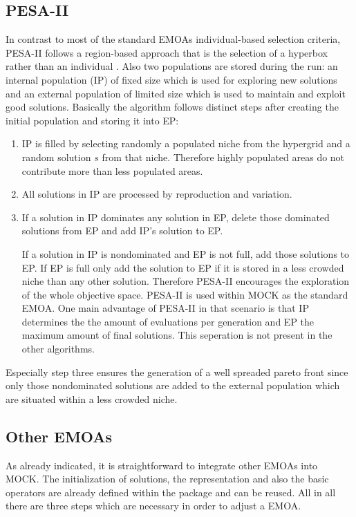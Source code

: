 \documentclass[parskip=half,DIV=14]{scrartcl}\usepackage[]{graphicx}\usepackage[]{color}
\begin{document}
\subsection{PESA-II}
In contrast to most of the standard EMOAs individual-based selection criteria, PESA-II follows a region-based approach that is the selection of a hyperbox rather than an individual \cite{pesa}. Also two populations are stored during the run: an internal population (IP) of fixed size which is used for exploring new solutions and an external population of limited size which is used to maintain and exploit good solutions. Basically the algorithm follows distinct steps after creating the initial population and storing it into EP:

\begin{enumerate}
\item IP is filled by selecting randomly a populated niche from the hypergrid and a random solution $s$ from that niche. Therefore highly populated areas do not contribute more than less populated areas.

\item All solutions in IP are processed by reproduction and variation.

\item If a solution in IP dominates any solution in EP, delete those dominated solutions from EP and add IP's solution to EP.

If a solution in IP is nondominated and EP is not full, add those solutions to EP. If EP is full only add the solution to EP if it is stored in a less crowded niche than any other solution. Therefore PESA-II encourages the exploration of the whole objective space. PESA-II is used within MOCK as the standard EMOA. One main advantage of PESA-II in that scenario is that IP determines the the amount of evaluations per generation and EP the maximum amount of final solutions. This seperation is not present in the other algorithms.
\end{enumerate}

Especially step three ensures the generation of a well spreaded pareto front since only those nondominated solutions are added to the external population which are situated within a less crowded niche.  
\subsection{Other EMOAs}
As already indicated, it is straightforward to integrate other EMOAs into MOCK. The initialization of solutions, the representation and also the basic operators are already defined within the package and can be reused. All in all there are three steps which are necessary in order to adjust a EMOA.
\end{document}
